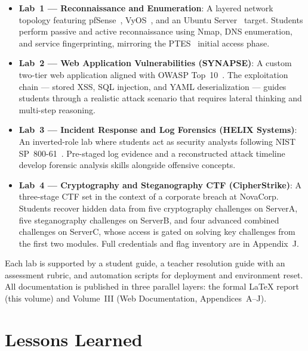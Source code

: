 \begin{itemize}
    \item \textbf{Lab~1 --- Reconnaissance and Enumeration}: A layered network
          topology featuring pfSense~\cite{pfsense}, VyOS~\cite{vyos}, and an
          Ubuntu Server~\cite{ubuntu} target. Students perform passive and active
          reconnaissance using Nmap, DNS enumeration, and service fingerprinting,
          mirroring the PTES~\cite{ptes} initial access phase.

    \item \textbf{Lab~2 --- Web Application Vulnerabilities (SYNAPSE)}: A custom
          two-tier web application aligned with OWASP Top~10~\cite{owasp2021}.
          The exploitation chain --- stored XSS, SQL injection, and YAML deserialization
          --- guides students through a realistic attack scenario that requires
          lateral thinking and multi-step reasoning.

    \item \textbf{Lab~3 --- Incident Response and Log Forensics (HELIX Systems)}:
          An inverted-role lab where students act as security analysts following NIST
          SP~800-61~\cite{nist_sp80061}. Pre-staged log evidence and a reconstructed
          attack timeline develop forensic analysis skills alongside offensive concepts.

    \item \textbf{Lab~4 --- Cryptography and Steganography CTF (CipherStrike)}:
          A three-stage CTF set in the context of a corporate breach at NovaCorp.
          Students recover hidden data from five cryptography challenges on ServerA,
          five steganography challenges on ServerB, and four advanced combined
          challenges on ServerC, whose access is gated on solving key challenges
          from the first two modules. Full credentials and flag inventory are in
          Appendix~J.
\end{itemize}

Each lab is supported by a student guide, a teacher resolution guide with an assessment
rubric, and automation scripts for deployment and environment reset. All documentation
is published in three parallel layers: the formal LaTeX report (this volume) and
Volume~III (Web Documentation, Appendices~A--J).

\section{Lessons Learned}

